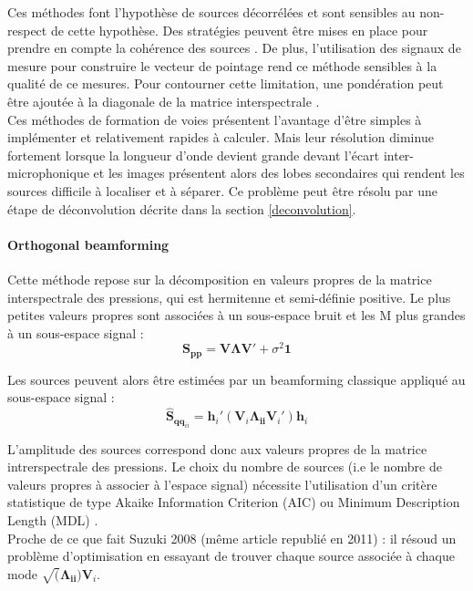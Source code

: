 Ces méthodes font l'hypothèse de sources décorrélées et sont sensibles au non-respect de cette hypothèse. Des stratégies peuvent être mises en place pour prendre en compte la cohérence des sources \citep{Jiang2003}. De plus, l'utilisation des signaux de mesure pour construire le vecteur de pointage rend ce méthode sensibles à la qualité de ce mesures. Pour contourner cette limitation, une pondération peut être ajoutée à la diagonale de la matrice interspectrale \citep{Li2003}.\\

Ces méthodes de formation de voies présentent l'avantage d'être simples à implémenter et relativement rapides à calculer. Mais leur résolution diminue fortement lorsque la longueur d'onde devient grande devant l'écart inter-microphonique et les images présentent alors des lobes secondaires qui rendent les sources difficile à localiser et à séparer. Ce problème peut être résolu par une étape de déconvolution décrite dans la section \ref{deconvolution}.\\

\paragraph{Orthogonal beamforming}
Cette méthode repose sur la décomposition en valeurs propres de la matrice interspectrale des pressions, qui est hermitenne et semi-définie positive. Le plus petites valeurs propres sont associées à un sous-espace bruit et les M plus grandes à un sous-espace signal : 
\begin{equation}
	\bm{S_{pp}} = \bm{V}\bm{\Lambda}\bm{V}' + \sigma^2\bm{1}
\end{equation}

Les sources peuvent alors être estimées par un beamforming classique appliqué au sous-espace signal : 
\begin{equation}
	\hat{\bm{S}}_{\bm{qq}_{ii}} = \bm{h}_i' (\bm{V}_i \bm{\Lambda_{ii}}\bm{V}_i') \bm{h}_i
\end{equation}

L'amplitude des sources correspond donc aux valeurs propres de la matrice intrerspectrale des pressions.
Le choix du nombre de sources (i.e le nombre de valeurs propres à associer à l'espace signal) nécessite l'utilisation d'un critère statistique de type Akaike Information Criterion (AIC) ou Minimum Description Length (MDL) \citep{Wax1985}.\\

Proche de ce que fait Suzuki 2008 (même article republié en 2011) : il résoud un problème d'optimisation en essayant de trouver chaque source associée à chaque mode $\sqrt(\bm{\Lambda_{ii}})\bm{V}_i$.

